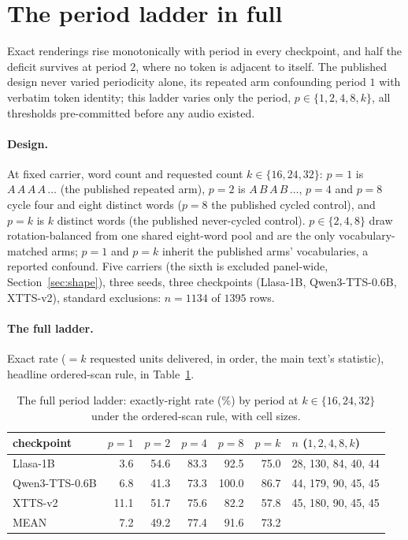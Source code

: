\section{The period ladder in full}
\label{sec:period}

Exact renderings rise monotonically with period in every checkpoint,
and half the deficit survives at period $2$, where no token is
adjacent to itself. The published design never varied periodicity
alone, its repeated arm confounding period $1$ with verbatim token
identity; this ladder varies only the period, $p\in\{1,2,4,8,k\}$,
all thresholds pre-committed before any audio existed.

\paragraph{Design.} At fixed carrier, word count and requested count
$k\in\{16,24,32\}$: $p{=}1$ is $A\,A\,A\,A\,\dots$ (the published
repeated arm), $p{=}2$ is $A\,B\,A\,B\,\dots$, $p{=}4$ and $p{=}8$
cycle four and eight distinct words ($p{=}8$ the published cycled
control), and $p{=}k$ is $k$ distinct words (the published
never-cycled control). $p\in\{2,4,8\}$ draw rotation-balanced from
one shared eight-word pool and are the only vocabulary-matched arms;
$p{=}1$ and $p{=}k$ inherit the published arms' vocabularies, a
reported confound. Five carriers (the sixth is excluded panel-wide,
Section~\ref{sec:shape}), three seeds, three checkpoints (Llasa-1B,
Qwen3-TTS-0.6B, XTTS-v2), standard exclusions: $n=1134$ of $1395$
rows.

\paragraph{The full ladder.} Exact rate ($=k$ requested units delivered, in
order, the main text's statistic), headline ordered-scan rule, in
Table~\ref{tab:fullladder}.

\begin{table}[tp]\centering
\caption{The full period ladder: exactly-right rate (\%) by period at $k\in\{16,24,32\}$ under the ordered-scan rule, with cell sizes.}
\label{tab:fullladder}
\begin{tabular}{@{}lrrrrrl@{}}
\toprule
checkpoint & $p{=}1$ & $p{=}2$ & $p{=}4$ & $p{=}8$ & $p{=}k$ & $n$ ($1,2,4,8,k$) \\
\midrule
Llasa-1B         &  3.6 & 54.6 & 83.3 &  92.5 & 75.0 & 28, 130, 84, 40, 44 \\
Qwen3-TTS-0.6B   &  6.8 & 41.3 & 73.3 & 100.0 & 86.7 & 44, 179, 90, 45, 45 \\
XTTS-v2          & 11.1 & 51.7 & 75.6 &  82.2 & 57.8 & 45, 180, 90, 45, 45 \\
\midrule
MEAN             &  7.2 & 49.2 & 77.4 &  91.6 & 73.2 & \\
\bottomrule
\end{tabular}
\end{table}

